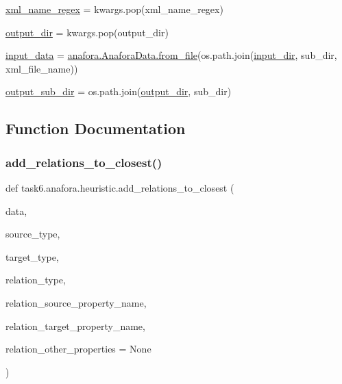 \begin{DoxyCompactItemize}
\item 
\hyperlink{namespacetask6_1_1anafora_1_1heuristic_a3804b5556c59fb441e428d47e4e77915}{xml\+\_\+name\+\_\+regex} = kwargs.\+pop(\textquotesingle{}xml\+\_\+name\+\_\+regex\textquotesingle{})
\item 
\hyperlink{namespacetask6_1_1anafora_1_1heuristic_a646753c8af303cd188bd90f92621827c}{output\+\_\+dir} = kwargs.\+pop(\textquotesingle{}output\+\_\+dir\textquotesingle{})
\item 
\hyperlink{namespacetask6_1_1anafora_1_1heuristic_ada6e7f32fd39001bf7703c8f138c876c}{input\+\_\+data} = \hyperlink{classtask6_1_1anafora_1_1AnaforaData_a56eaf8ae37770b37cf08c7ae12b07ca9}{anafora.\+Anafora\+Data.\+from\+\_\+file}(os.\+path.\+join(\hyperlink{namespacetask6_1_1anafora_1_1heuristic_a035f8d80cd7a366418422da543c3e2ff}{input\+\_\+dir}, sub\+\_\+dir, xml\+\_\+file\+\_\+name))
\item 
\hyperlink{namespacetask6_1_1anafora_1_1heuristic_a80bc05906d57d97767a9d0b0c5443041}{output\+\_\+sub\+\_\+dir} = os.\+path.\+join(\hyperlink{namespacetask6_1_1anafora_1_1heuristic_a646753c8af303cd188bd90f92621827c}{output\+\_\+dir}, sub\+\_\+dir)
\end{DoxyCompactItemize}


\subsection{Function Documentation}
\mbox{\label{namespacetask6_1_1anafora_1_1heuristic_aeec05eea339675bfa584e8486470ba83}} 
\subsubsection{\texorpdfstring{add\+\_\+relations\+\_\+to\+\_\+closest()}{add\_relations\_to\_closest()}}
{\footnotesize\ttfamily def task6.\+anafora.\+heuristic.\+add\+\_\+relations\+\_\+to\+\_\+closest (\begin{DoxyParamCaption}\item[{}]{data,  }\item[{}]{source\+\_\+type,  }\item[{}]{target\+\_\+type,  }\item[{}]{relation\+\_\+type,  }\item[{}]{relation\+\_\+source\+\_\+property\+\_\+name,  }\item[{}]{relation\+\_\+target\+\_\+property\+\_\+name,  }\item[{}]{relation\+\_\+other\+\_\+properties = {\ttfamily None} }\end{DoxyParamCaption})}

